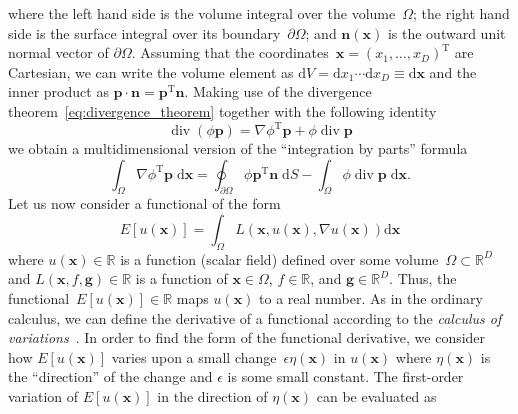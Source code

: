 \documentclass[12pt,a4paper]{article}
\begin{document}
where the left hand side is the volume integral over the volume~$\Omega$;
the right hand side is the surface integral over its boundary~$\partial\Omega$; and
$\mathbf{n}(\mathbf{x})$ is the outward unit normal vector of $\partial\Omega$.
Assuming that the coordinates~$\mathbf{x} = \left( x_1, \dots, x_D \right)^{\operatorname{T}}$ are
Cartesian, we can write the volume element as
$\mathrm{d}V = \mathrm{d}x_1 \cdots \mathrm{d}x_D \equiv \mathrm{d}\mathbf{x}$ and
the inner product as $\mathbf{p} \cdot \mathbf{n} = \mathbf{p}^{\operatorname{T}} \mathbf{n}$.
Making use of the divergence theorem~\eqref{eq:divergence_theorem}
together with the following identity
\begin{equation}
\operatorname{div}\left(\phi\mathbf{p}\right) =
{\nabla\phi}^{\operatorname{T}} \mathbf{p} + \phi \operatorname{div}\mathbf{p}
\end{equation}
we obtain a multidimensional version of the ``integration by parts'' formula
\begin{equation}
\int_{\Omega} {\nabla\phi}^{\operatorname{T}} \mathbf{p} \; \mathrm{d}\mathbf{x} =
\oint_{\partial\Omega} \phi\mathbf{p}^{\operatorname{T}} \mathbf{n} \; \mathrm{d}S -
\int_{\Omega} \phi \operatorname{div}\mathbf{p} \; \mathrm{d}\mathbf{x} .
\label{eq:multidimensional_integration_by_parts}
\end{equation}
Let us now consider a functional of the form
\begin{equation}
E\left[u(\mathbf{x})\right] =
\int_{\Omega} L\left(\mathbf{x}, u(\mathbf{x}), \nabla u(\mathbf{x})\right) \mathrm{d}\mathbf{x}
\end{equation}
where $u(\mathbf{x}) \in \mathbb{R}$ is a function (scalar field) defined over
some volume~$\Omega \subset \mathbb{R}^{D}$ and
$L(\mathbf{x}, f, \mathbf{g}) \in \mathbb{R}$ is a function of
$\mathbf{x} \in \Omega$, $f \in \mathbb{R}$, and $\mathbf{g} \in \mathbb{R}^{D}$.
Thus, the functional~$E\left[u(\mathbf{x})\right] \in \mathbb{R}$ maps $u(\mathbf{x})$ to
a real number.
As in the ordinary calculus, we can define the derivative of a functional according to
the \emph{calculus of variations}~\citep{Feynman:FeynmanLectures2,Bishop:PRML}.
In order to find the form of the functional derivative,
we consider how $E\left[u(\mathbf{x})\right]$ varies upon
a small change~$\epsilon\eta(\mathbf{x})$ in $u(\mathbf{x})$
where $\eta(\mathbf{x})$ is the ``direction'' of the change and
$\epsilon$ is some small constant.
The first-order variation of $E\left[u(\mathbf{x})\right]$ in the direction of $\eta(\mathbf{x})$
can be evaluated as
\end{document}
